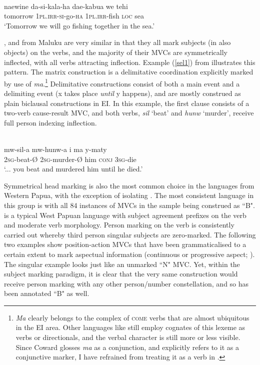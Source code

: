 \ea 
{}\\
\gll naewine da-si-kala-ha dae-kabua we tehi \\
tomorrow 1\textsc{pl}.\textsc{irr}-\textsc{si}-go-\textsc{ha} 1\textsc{pl}.\textsc{irr}-fish \textsc{loc} sea \\
\glft `Tomorrow we will go fishing together in the sea.' \\ 
\z

,  and  from Maluku are very similar in that they all mark subjects (in  also objects) on the verbs, and the majority of their MVCs are symmetrically inflected, with all verbs attracting inflection. Example (\ref{sel1}) from  illustrates this pattern. The matrix construction is a delimitative coordination explicitly marked by use of \textit{ma}.\footnote{\textit{Ma} clearly belongs to the complex of \textsc{come} verbs that are almost ubiquitous in the EI area. Other languages like  still employ cognates of this lexeme as verbs or directionals, and the verbal character is still more or less visible. Since Coward glosses \textit{ma} as a conjunction, and explicitly refers to it as a conjunctive marker, I have refrained from treating it as a verb in .} Delimitative constructions consist of both a main event and a delimiting event (x takes place \textit{until} y happens), and are mostly construed as plain biclausal constructions in EI. In this example, the first clause consists of a two-verb cause-result MVC, and both verbs, \textit{sil} `beat' and \textit{hunw} `murder', receive full person indexing inflection.

\ea \label{sel1}
\\
\gll mw-sil-a mw-hunw-a i ma y-maty \\
2\textsc{sg}-beat-Ø 2\textsc{sg}-murder-Ø him \textsc{conj} 3\textsc{sg}-die \\
\glft `... you beat and murdered him until he died.'\\ 
\z

Symmetrical head marking is also the most common choice in the languages from Western Papua, with the exception of isolating . The most consistent language in this group is  with all 84 instances of MVCs in the sample being construed as ``B".  is a typical West Papuan language with subject agreement prefixes on the verb and moderate verb morphology. Person marking on the verb is consistently carried out whereby third person singular subjects are zero-marked. The following two examples show position-action MVCs that have been grammaticalised to a certain extent to mark aspectual information (continuous or progressive aspect; \citealt[296]{gravelle2010grammar}). The singular example looks just like an unmarked ``N" MVC. Yet, within the  subject marking paradigm, it is clear that the very same construction would receive person marking with any other person/number constellation, and so has been annotated ``B" as well.

